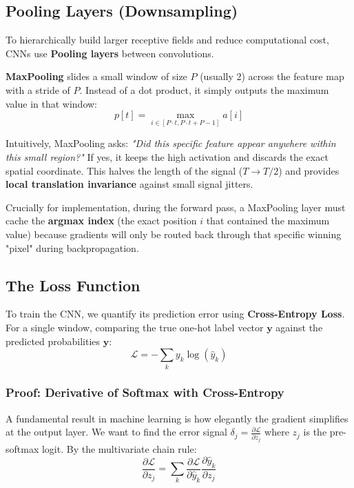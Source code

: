 \subsection{Pooling Layers (Downsampling)}
To hierarchically build larger receptive fields and reduce computational cost, CNNs use \textbf{Pooling layers} between convolutions. 

\textbf{MaxPooling} slides a small window of size $P$ (usually 2) across the feature map with a stride of $P$. Instead of a dot product, it simply outputs the maximum value in that window:
\begin{equation}
    p[t] = \max_{i \in [P \cdot t, P \cdot t + P - 1]} a[i]
\end{equation}

Intuitively, MaxPooling asks: \textit{"Did this specific feature appear anywhere within this small region?"} If yes, it keeps the high activation and discards the exact spatial coordinate. This halves the length of the signal ($T \rightarrow T/2$) and provides \textbf{local translation invariance} against small signal jitters. 

Crucially for implementation, during the forward pass, a MaxPooling layer must cache the \textbf{argmax index} (the exact position $i$ that contained the maximum value) because gradients will only be routed back through that specific winning "pixel" during backpropagation.

\subsection{The Loss Function}
To train the CNN, we quantify its prediction error using \textbf{Cross-Entropy Loss}. For a single window, comparing the true one-hot label vector $\mathbf{y}$ against the predicted probabilities $\mathbf{\hat{y}}$:
\begin{equation}
    \mathcal{L} = -\sum_k y_k \log(\hat{y}_k)
\end{equation}

\subsubsection*{Proof: Derivative of Softmax with Cross-Entropy}
A fundamental result in machine learning is how elegantly the gradient simplifies at the output layer. We want to find the error signal $\delta_j = \frac{\partial \mathcal{L}}{\partial z_j}$ where $z_j$ is the pre-softmax logit. By the multivariate chain rule:
\begin{equation}
    \frac{\partial \mathcal{L}}{\partial z_j} = \sum_k \frac{\partial \mathcal{L}}{\partial \hat{y}_k} \frac{\partial \hat{y}_k}{\partial z_j}
\end{equation}

